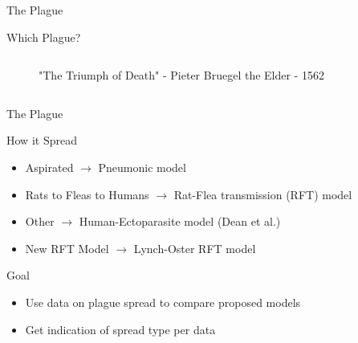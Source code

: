 \documentclass[t,10pt,fleqn]{beamer}
\begin{document}
\begin{frame}{The Plague}
\begin{block}{Which Plague?}
\begin{columns}
\begin{column}{0.55\textwidth}
\begin{figure}
					\caption{"The Triumph of Death" - Pieter Bruegel the Elder - 1562}
				\end{figure}
			\end{column}
		\end{columns}
	\end{block}
\end{frame}

\begin{frame}{The Plague}
	\vspace{-.3cm}
	\begin{block}{How it Spread}
		\begin{itemize}
			\pause
			\item Aspirated \pause $\rightarrow$ Pneumonic model
			      \pause
			\item Rats to Fleas to Humans \pause $\rightarrow$ Rat-Flea transmission (RFT) model
			      \pause
			\item Other \pause $\rightarrow$ Human-Ectoparasite model (Dean et al.)
			      \pause
			\item New RFT Model \pause $\rightarrow$ Lynch-Oster RFT model
		\end{itemize}
	\end{block}
	\pause
	\begin{block}{Goal}
		\begin{itemize}
			\pause
			\item Use data on plague spread to compare proposed models \pause
			\item Get indication of spread type per data
		\end{itemize}
	\end{block}
\end{frame}

%	


\end{document}
